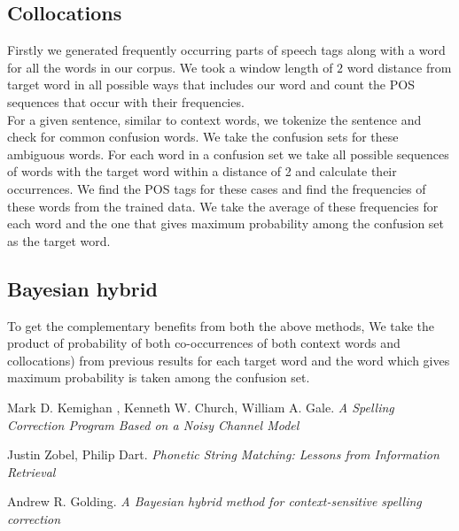 \documentclass{article}
\begin{document}
		\subsection{Collocations}
			Firstly we generated frequently occurring parts of speech tags along with a word for all the words in our corpus. We took a window length of $2$ word distance from target word in all possible ways that includes our word and count the POS sequences that occur with their frequencies.\\
			For a given sentence, similar to context words, we tokenize the sentence and check for common confusion words. We take the confusion sets for these ambiguous words. For each word in a confusion set we take all possible sequences of words with the target word within a distance of 2 and calculate their occurrences. We find the POS tags for these cases and find the frequencies of these words from the trained data. We take the average of these frequencies for each word and the one that gives maximum probability among the confusion set as the target word.				
		\subsection{Bayesian hybrid}
			To get the complementary benefits from both the above methods, We take the product of probability of both co-occurrences of both context words and collocations) from previous results for each target word and the word which gives maximum probability is taken among the confusion set.			
			
	\medskip
	
	\begin{thebibliography}{9}
		Mark D. Kemighan , Kenneth W. Church, William A. Gale. 
		\textit{A Spelling Correction Program Based on a Noisy Channel Model}
		
		Justin Zobel, Philip Dart. 
		\textit{Phonetic String Matching: Lessons from Information Retrieval}	
		
		Andrew R. Golding.
		\textit{A Bayesian hybrid method for context-sensitive spelling correction}
	\end{thebibliography}
	
\end{document}
